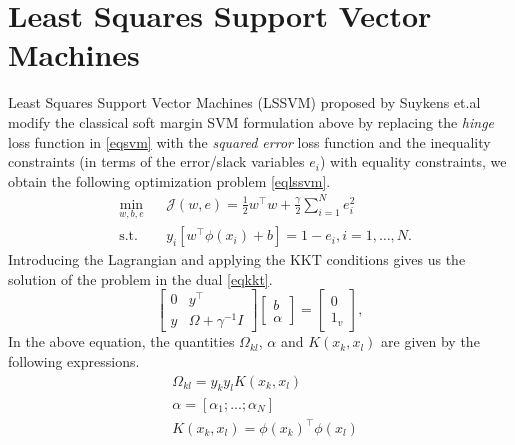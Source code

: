 \section{Least Squares Support Vector Machines}
Least Squares Support Vector Machines (LSSVM) proposed by Suykens et.al \cite{Suykens2002, Suykens1999} modify the classical soft margin SVM formulation above by replacing the \textit{hinge} loss function in \eqref{eqsvm} with the \textit{squared error} loss function and the inequality constraints (in terms of the error/slack variables $e_i$) with equality constraints, we obtain the following optimization problem \eqref{eqlssvm}.
\begin{equation}\label{eqlssvm}
\begin{aligned}
& \underset{w,b,e}{\text{min}}
& & \mathcal{J}(w,e) = \frac{1}{2}w^{\intercal}w + \frac{\gamma}{2}\sum\limits_{i=1}^N e_{i}^2 \\
& \text{s.t.}
& & y_{i}[ w^{\intercal}\phi(x_{i})+b ] = 1 - e_{i}, i=1,\ldots ,N.
\end{aligned}
\end{equation}
Introducing the Lagrangian and applying the KKT conditions gives us the solution of the problem in the dual \eqref{eqkkt}.
\begin{equation}\label{eqkkt}
\left[\begin{array}{c|c}
   0  & y^\intercal   \\ \hline
   y & \Omega + \gamma^{-1} \mathit{I} 
\end{array}\right] 
\left[\begin{array}{c}
   b    \\ \hline
   \alpha  
\end{array}\right] = \left[\begin{array}{c}
   0    \\ \hline
   1_v  
\end{array}\right],
\end{equation}
In the above equation, the quantities $\Omega_{kl}$, $\alpha$ and $K(x_k,x_l)$ are given by the following expressions.
\begin{equation*}
\begin{aligned}
& \Omega_{kl} = y_{k}y_{l}K(x_{k}, x_{l}) \\
& \alpha = \left[\alpha_1 ; ... ; \alpha_N \right] \\
& K(x_k,x_l) = \phi(x_k)^\intercal\phi(x_l) \\
\end{aligned}
\end{equation*}

